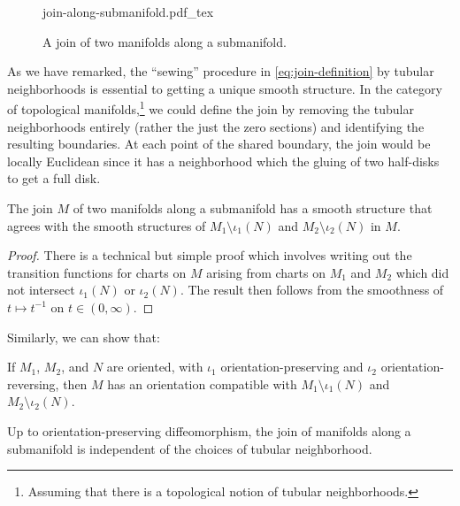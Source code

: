 \begin{figure}[ht]
	\centering
	{join-along-submanifold.pdf_tex}
	\caption{A join of two manifolds along a submanifold.}\label{fig:join-along-submanifold}
\end{figure}

\begin{remark*}
	As we have remarked, the ``sewing'' procedure in \cref{eq:join-definition} by tubular neighborhoods is essential to getting a unique smooth structure. In the category of topological manifolds,\footnote{Assuming that there is a topological notion of tubular neighborhoods.} we could define the join by removing the tubular neighborhoods entirely (rather the just the zero sections) and identifying the resulting boundaries.
	At each point of the shared boundary, the join would be locally Euclidean since it has a neighborhood which the gluing of two half-disks to get a full disk.
\end{remark*}

\begin{proposition}\label{prop:join-along-submanifolds-well-defined}
	The join $M$ of two manifolds along a submanifold has a smooth structure that agrees with the smooth structures of $M_1\setminus \iota_1(N)$ and $M_2\setminus \iota_2(N)$ in $M$. 
\end{proposition}
\begin{proof}
	There is a technical but simple proof which involves writing out the transition functions for charts on $M$ arising from charts on $M_1$ and $M_2$ which did not intersect $\iota_1(N)$ or $\iota_2(N)$. The result then follows from the smoothness of $t \mapsto t^{-1}$ on $t\in (0,\infty)$.
\end{proof}

Similarly, we can show that:

\begin{proposition}\label{prop:join-along-submanifolds-orientation}
	If $M_1$, $M_2$, and $N$ are oriented, with $\iota_1$ orientation-preserving and $\iota_2$ orientation-reversing, then $M$ has an orientation compatible with $M_1\setminus \iota_1(N)$ and $M_2\setminus \iota_2(N)$.
\end{proposition}

\begin{theorem}
	Up to orientation-preserving diffeomorphism, the join of manifolds along a submanifold is independent of the choices of tubular neighborhood.
\end{theorem}

